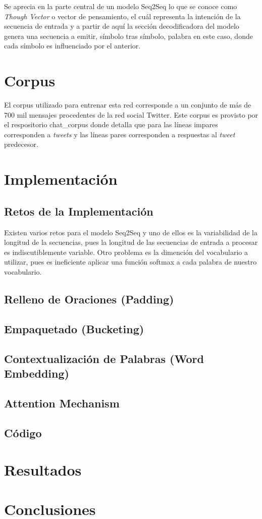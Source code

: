 \documentclass[12pt, letterpaper]{article}
\begin{document}
    Se aprecia en la parte central de un modelo Seq2Seq lo que se conoce como \emph{Though Vector} o vector de pensamiento, el cuál representa la intención de la secuencia de entrada y a partir de aquí la sección decodificadora del modelo genera una secuencia a emitir, símbolo tras símbolo, palabra en este caso, donde cada símbolo es influenciado por el anterior.

    \section{Corpus}
    El corpus utilizado para entrenar esta red corresponde a un conjunto de más de 700 mil mensajes procedentes de la red social Twitter. Este corpus es provisto por el respositorio chat\_corpus\cite{Ma_2020} donde detalla que para las líneas impares corresponden a \emph{tweets} y las líneas pares corresponden a respuestas al \emph{tweet} predecesor.

    \section{Implementación}

    \subsection{Retos de la Implementación}
    Existen varios retos para el modelo Seq2Seq y uno de ellos es la variabilidad de la longitud de la secuencias, pues la longitud de las secuencias de entrada a procesar es indiscutiblemente variable. Otro problema es la dimención del vocabulario a utilizar, pues es ineficiente aplicar una función softmax a cada palabra de nuestro vocabulario\cite{Ramamoorthy}.

    \subsection{Relleno de Oraciones (Padding)}
    \subsection{Empaquetado (Bucketing)}
    \subsection{Contextualización de Palabras (Word Embedding)}
    \subsection{Attention Mechanism}
    \subsection{Código}

    \section{Resultados}
    \section{Conclusiones}

    \pagebreak
    \printbibliography[title={Bibliografía}]
\end{document}

